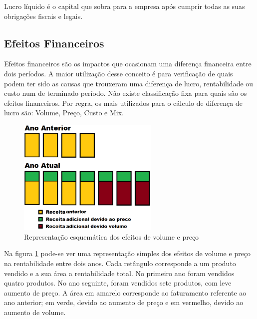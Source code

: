 \documentclass[12pt]{article}
\begin{document}
	Lucro líquido é o capital que sobra para a empresa após cumprir todas as suas obrigações fiscais e legais.

\subsection{Efeitos Financeiros}

	Efeitos financeiros são os impactos que ocasionam uma diferença financeira entre dois períodos. A maior utilização desse conceito é para verificação de quais podem ter sido as causas que trouxeram uma diferença de lucro, rentabilidade ou custo num de terminado período. Não existe classificação fixa para quais são os efeitos financeiros. Por regra, os mais utilizados para o cálculo de diferença de lucro são: Volume, Preço, Custo e Mix.

\begin{figure}[h!]
	\centering
	\includegraphics[width=0.6\textwidth]{img/effects.png}
	\caption{Representação esquemática dos efeitos de volume e preço}
	\label{fig:effects}
\end{figure}

	Na figura \ref{fig:effects} pode-se ver uma representação simples dos efeitos de volume e preço na rentabilidade entre dois anos. Cada retângulo corresponde a um produto vendido e a sua área a rentabilidade total. No primeiro ano foram vendidos quatro produtos. No ano seguinte, foram vendidos sete produtos, com leve aumento de preço. A área em amarelo corresponde ao faturamento referente ao ano anterior; em verde, devido ao aumento de preço e em vermelho, devido ao aumento de volume.

\end{document}
